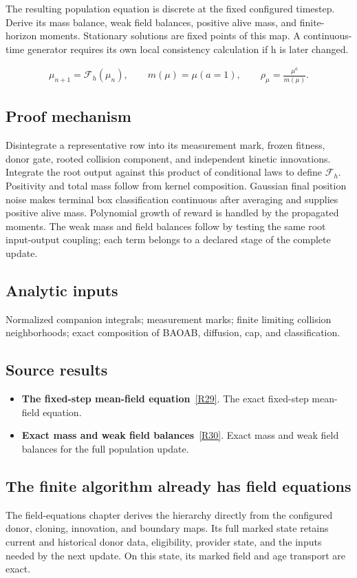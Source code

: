 \documentclass[11pt,a4paper]{article}
\begin{document}
The resulting population equation is discrete at the fixed configured timestep. Derive its mass balance, weak field balances, positive alive mass, and finite-horizon moments. Stationary solutions are fixed points of this map. A continuous-time generator requires its own local consistency calculation if h is later changed.


\begin{gather*}
\mu_{n+1}=\mathcal F_h(\mu_n),\qquad m(\mu)=\mu(a=1),\qquad \rho_\mu=\frac{\mu^a}{m(\mu)}.
\end{gather*}
\subsection*{Proof mechanism}
Disintegrate a representative row into its measurement mark, frozen fitness, donor gate, rooted collision component, and independent kinetic innovations. Integrate the root output against this product of conditional laws to define \(\mathcal F_h\). Positivity and total mass follow from kernel composition. Gaussian final position noise makes terminal box classification continuous after averaging and supplies positive alive mass. Polynomial growth of reward is handled by the propagated moments. The weak mass and field balances follow by testing the same root input-output coupling; each term belongs to a declared stage of the complete update.
\subsection*{Analytic inputs}
Normalized companion integrals; measurement marks; finite limiting collision neighborhoods; exact composition of BAOAB, diffusion, cap, and classification.
\subsection*{Source results}
\begin{itemize}
\item \textbf{The fixed-step mean-field equation}~\hyperref[src:thm-mean-field-equation]{[R29]}. The exact fixed-step mean-field equation.
\item \textbf{Exact mass and weak field balances}~\hyperref[src:thm-mass-conservation]{[R30]}. Exact mass and weak field balances for the full population update.
\end{itemize}
\subsection*{The finite algorithm already has field equations}
The field-equations chapter derives the hierarchy directly from the configured donor, cloning, innovation, and boundary maps. Its full marked state retains current and historical donor data, eligibility, provider state, and the inputs needed by the next update. On this state, its marked field and age transport are exact.
\end{document}
